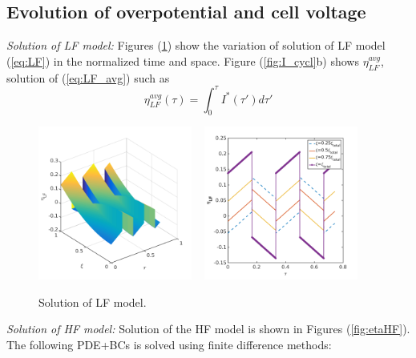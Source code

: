 \documentclass[]{article}
\begin{document}
\subsection{Evolution of overpotential and cell voltage}

\textit{Solution of LF model:}
Figures (\ref{fig:etaLF}) show the variation of solution of LF model (\ref{eq:LF}) in the normalized time and space. Figure (\ref{fig:I_cycl}b) shows $\eta_{LF}^{avg}$, solution of (\ref{eq:LF_avg}) such as
%
\begin{equation}\label{eq:Iprim}
{\eta_{LF}^{avg}}(\tau) = \int_0^{\tau} I^*(\tau') d\tau' 
\end{equation}
\begin{figure}[h]
    \centering
    \includegraphics[trim = 0in 0in 0in 0in, clip, width=0.45\textwidth]{figures/cyclic_new/etaLF3d.png}
    ~
    \includegraphics[trim = 0in 0in 0in 0in, clip, width=0.45\textwidth]{figures/cyclic_new/etaLF_t.png} 
    \vspace{-0.2in}     
    \caption{Solution of LF model.}
    \label{fig:etaLF}
\end{figure}
%
\textit{Solution of HF model:}
Solution of the HF model is shown in Figures (\ref{fig:etaHF}). The following PDE+BCs is solved using finite difference methods:
\end{document}
